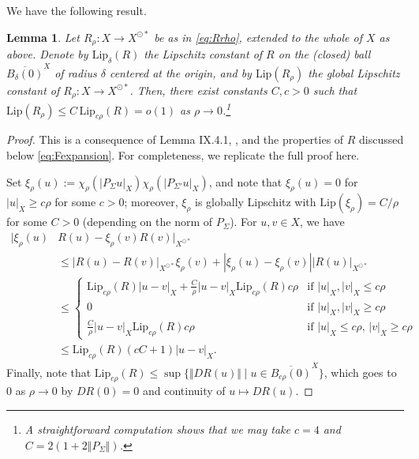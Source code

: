 \documentclass[a4paper, 12pt, oneside, reqno, notitlepage]{amsart}
\theoremstyle{plain}
\newtheorem{lemma}[theorem]{Lemma}
\theoremstyle{definition}
\theoremstyle{remark}
\newcommand{\lip}{\mathrm{Lip}}
\begin{document}
We have the following result.

\begin{lemma} \label{lemma:Lipschitz}
    Let $R_\rho :X \to X^{\odot *}$ be as in \eqref{eq:Rrho}, extended to the whole of $X$ as above.
    Denote by $\lip_\delta(R)$ the Lipschitz constant of $R$ on the (closed) ball $\overline{B_\delta(0)}^X$ of radius $\delta$ centered at the origin, and by $\lip(R_\rho)$ the global Lipschitz constant of $R_\rho:X \to X^{\odot *} $.
    Then, there exist  constants $C,c >0 $ such that $\lip(R_\rho) \leq  C \, \lip_{c \rho}(R) = o(1)$ as $\rho \to 0$.\footnote{A straightforward computation shows that we may take $c = 4$ and $C = 2(1+2\Vert P_\Sigma \Vert)$.}
\end{lemma}

\begin{proof}
    This is a consequence of Lemma IX.4.1, \cite{diekmann2012delay}, and the properties of $R$ discussed below \eqref{eq:Fexpansion}. 
    For completeness, we replicate the full proof here.
    
    Set $\xi_\rho(u) := \chi_\rho ( |P_\Sigma u |_X) \chi_\rho (|P_{\Sigma'} u |_X)$, and note that $\xi_\rho(u) = 0 $ for $|u|_X \geq c \rho $ for some $c > 0$; moreover, $\xi_\rho$ is globally Lipschitz with $\lip(\xi_\rho) = C/\rho$ for some $C > 0$ (depending on the norm of $P_\Sigma$).
    For $u,v \in X$, we have
    \begin{align*}
        | \xi_\rho (u) &R(u) - \xi_\rho (v) R(v)  |_{X^{\odot *}} \\
        &\leq | R(u) -  R(v)  |_{X^{\odot *}} \xi_{\rho}(v) + |\xi_\rho (u)- \xi_\rho (v)| | R(u)   |_{X^{\odot *}}  \\
        & \leq 
        \begin{cases}
             \lip_{c\rho}(R) |u-v|_X + \frac{C}{\rho}|u-v|_X \lip_{c\rho}(R) c\rho  & \text{if $|u|_X,|v|_X \leq c\rho $} \\
             0 & \text{if $|u|_X,|v|_X \geq c\rho $} \\
             \frac{C}{\rho} |u-v|_X \lip_{c\rho}(R) c\rho  & \text{if $|u|_X \leq c\rho$, $|v|_X \geq c\rho $} 
        \end{cases}\\
        &\leq \lip_{c\rho}(R) (c C + 1) |u-v|_X.
    \end{align*}
    Finally, note that $\lip_{c \rho}(R) \leq \sup\{ \Vert DR (u)\Vert \; | \; u \in \overline{B_{c\rho}(0)}^X  \}$, which goes to $0$ as $\rho \to 0$ by $DR(0) = 0 $ and continuity of $u \mapsto DR(u)$.
\end{proof}
\end{document}
